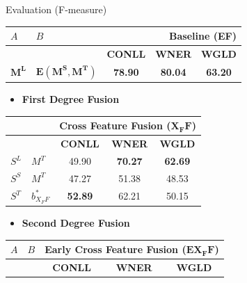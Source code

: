 \documentclass[10pt,=table]{beamer}
\newcommand\mlex{M^{\scriptscriptstyle L}}
\newcommand\mstd{M^{\scriptscriptstyle T}}
\newcommand\slex{S^{\scriptscriptstyle L}}
\newcommand\ssyn{S^{\scriptscriptstyle S}}
\newcommand\sstd{S^{\scriptscriptstyle T}}
\begin{document}
\begin{frame}{Evaluation (F-measure)}
\begin{minipage}[c][.3\textheight][c]{\linewidth}
\centering
	\begin{tabular}{@{}llccc@{}}
			\toprule
    $A$      &    $B$       & \multicolumn{3}{r}{\textbf{Baseline (EF)} }                                            \\ \midrule
          &           & \textbf{CONLL}                      & \textbf{WNER}                      & \textbf{WGLD}                      \\ \cmidrule{3-5}
          	\rowcolor{orangeEric}
			$\mathbf{\mlex}$ & $\mathbf{E(M^S, M^T)}$ & \textbf{78.90}                      & \textbf{80.04}                     & \textbf{63.20}                   \\ \bottomrule
	\end{tabular}
\end{minipage}

\begin{overprint}
		\begin{itemize}
		\item[] \large \textbf{First Degree Fusion}
		\end{itemize}
		\begin{minipage}[c][.4\textheight][c]{\linewidth}
		\centering
		\begin{tabular}{@{}llccc@{}}
		\toprule
			          &           & \multicolumn{3}{r}{\textbf{Cross Feature Fusion ($\mathbf{X_FF}$)}} \\
			\midrule
			          &           & \textbf{CONLL}                      & \textbf{WNER}                      & \textbf{WGLD}                      \\ \cmidrule{3-5}
			$\slex$ &$\mstd$        & 49.90                      & \textbf{70.27}                     & \textbf{62.69}                    \\
			$\ssyn$ & $\mstd$ & 47.27                      & 51.38                     & 48.53                     \\
			$\sstd$ & ${b}^*_{\scriptscriptstyle X_FF}$        & \textbf{52.89}                      & 62.21                     & 50.15                     \\
			\bottomrule
		\end{tabular}
		\end{minipage}
		\begin{itemize}
			\item[] \large \textbf{Second Degree Fusion}
		\end{itemize}
		\begin{minipage}[c][.4\textheight][c]{\linewidth}
		\centering
		\begin{tabular}{@{}llccc@{}}
		\toprule
		$A$&$B$& \multicolumn{3}{r}{\textbf{Early Cross Feature Fusion ($\mathbf{EX_FF}$)}} \\ \midrule
			                         &                & \textbf{CONLL} & \textbf{WNER}  &             \textbf{WGLD}             \\
			\cmidrule{3-5}
		

\end{tabular}
\end{minipage}
\end{overprint}
\end{frame}
\end{document}
